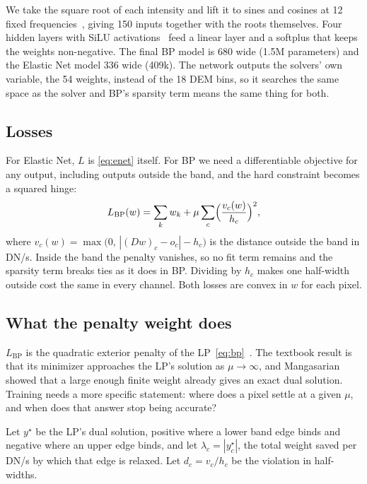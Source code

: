We take the square root of each intensity and lift it to sines and cosines at 12 fixed frequencies~\cite{tancik2020fourier,mildenhall2020nerf}, giving 150 inputs together with the roots themselves. Four hidden layers with SiLU activations~\cite{elfwing2018silu} feed a linear layer and a softplus that keeps the weights non-negative. The final BP model is 680 wide (1.5M parameters) and the Elastic Net model 336 wide (409k). The network outputs the solvers' own variable, the 54 weights, instead of the 18 DEM bins, so it searches the same space as the solver and BP's sparsity term means the same thing for both.

\subsection{Losses}

For Elastic Net, $L$ is \cref{eq:enet} itself. For BP we need a differentiable objective for any output, including outputs outside the band, and the hard constraint becomes a squared hinge:
\begin{equation}
  L_{\mathrm{BP}}(w)=\sum_{k} w_k+\mu\sum_{c}\Bigl(\frac{v_c(w)}{h_c}\Bigr)^2,
  \label{eq:loss-bp}
\end{equation}
where $v_c(w)=\max\bigl(0,\,|(Dw)_c-o_c|-h_c\bigr)$ is the distance outside the band in DN/s. Inside the band the penalty vanishes, so no fit term remains and the sparsity term breaks ties as it does in BP. Dividing by $h_c$ makes one half-width outside cost the same in every channel. Both losses are convex in $w$ for each pixel.

\subsection{What the penalty weight does}
\label{sec:law}

$L_{\mathrm{BP}}$ is the quadratic exterior penalty of the LP~\eqref{eq:bp}~\cite{courant1943variational,fiacco1968nonlinear,nocedal2006numerical}. The textbook result is that its minimizer approaches the LP's solution as $\mu\to\infty$, and Mangasarian~\cite{mangasarian2004newton} showed that a large enough finite weight already gives an exact dual solution. Training needs a more specific statement: where does a pixel settle at a given $\mu$, and when does that answer stop being accurate?

Let $y^\star$ be the LP's dual solution, positive where a lower band edge binds and negative where an upper edge binds, and let $\lambda_c=|y^\star_c|$, the total weight saved per DN/s by which that edge is relaxed. Let $d_c=v_c/h_c$ be the violation in half-widths.

